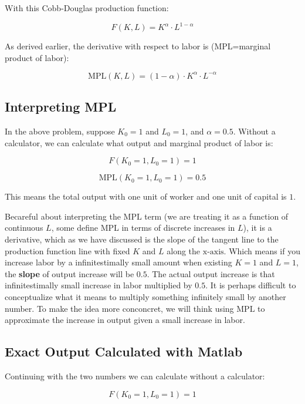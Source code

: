 \documentclass[
]{book}
\begin{document}
With this Cobb-Douglas production function:

\[F(K,L)=K^{\alpha } \cdot L^{1-\alpha }\]

As derived earlier, the derivative with respect to labor is
(MPL=marginal product of labor):

\[\textrm{MPL}(K,L)=(1-\alpha )\cdot K^{\alpha } \cdot L^{-\alpha }\]

\hypertarget{interpreting-mpl}{%
\subsection{Interpreting MPL}\label{interpreting-mpl}}

In the above problem, suppose \(K_0 =1\) and \(L_0 =1\), and \(\alpha =0.5\).
Without a calculator, we can calculate what output and marginal product
of labor is:

\[F(K_0 =1,L_0 =1)=1\]

\[\textrm{MPL}(K_0 =1,L_0 =1)=0.5\]

This means the total output with one unit of worker and one unit of
capital is \(1\).

Becareful about interpreting the \(\textrm{MPL}\) term (we are treating it
as a function of continuous \(L\), some define MPL in terms of discrete
increases in \(L\)), it is a derivative, which as we have discussed is the
slope of the tangent line to the production function line with fixed \(K\)
and \(L\) along the \(\textrm{x}\textrm{-}\textrm{axis}\). Which means if
you increase labor by a infinitestimally small amount when existing
\(K=1\) and \(L=1\), the \textbf{slope} of output increase will be \(0.5\). The
actual output increase is that infinitestimally small increase in labor
multiplied by \(0.5\). It is perhaps difficult to conceptualize what it
means to multiply something infinitely small by another number. To make
the idea more conconcret, we will think using \(\textrm{MPL}\) to
approximate the increase in output given a small increase in labor.

\hypertarget{exact-output-calculated-with-matlab}{%
\subsection{Exact Output Calculated with Matlab}\label{exact-output-calculated-with-matlab}}

Continuing with the two numbers we can calculate without a calculator:

\[F(K_0 =1,L_0 =1)=1\]
\end{document}
